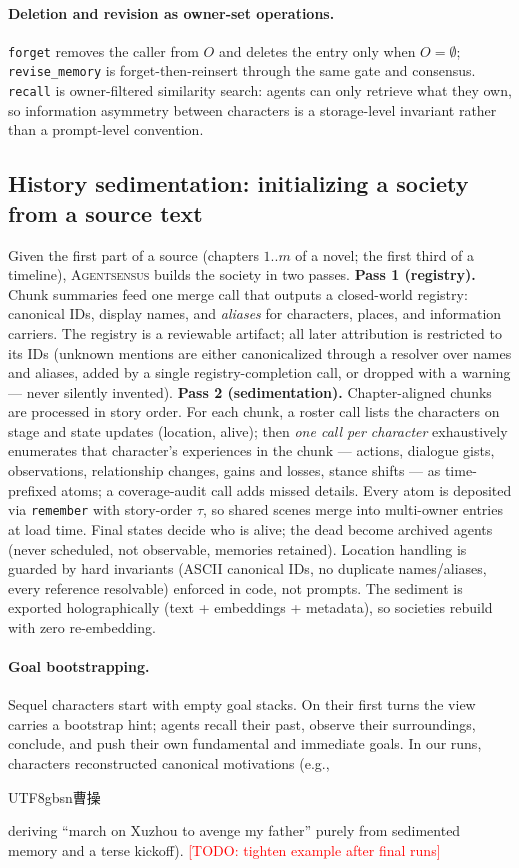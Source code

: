 \documentclass[11pt]{article}
\newcommand{\sysname}{\textsc{Agentsensus}}
\newcommand{\todo}[1]{\textcolor{red}{[TODO: #1]}}
\begin{document}
\paragraph{Deletion and revision as owner-set operations.}
\texttt{forget} removes the caller from $O$ and deletes the entry only when
$O=\emptyset$; \texttt{revise\_memory} is forget-then-reinsert through the same
gate and consensus. \texttt{recall} is owner-filtered similarity search: agents
can only retrieve what they own, so information asymmetry between characters is
a storage-level invariant rather than a prompt-level convention.

\subsection{History sedimentation: initializing a society from a source text}
\label{sec:sedimentation}
Given the first part of a source (chapters $1..m$ of a novel; the first third
of a timeline), \sysname{} builds the society in two passes.
\textbf{Pass 1 (registry).} Chunk summaries feed one merge call that outputs a
closed-world registry: canonical IDs, display names, and \emph{aliases} for
characters, places, and information carriers. The registry is a reviewable
artifact; all later attribution is restricted to its IDs (unknown mentions are
either canonicalized through a resolver over names and aliases, added by a
single registry-completion call, or dropped with a warning --- never silently
invented).
\textbf{Pass 2 (sedimentation).} Chapter-aligned chunks are processed in story
order. For each chunk, a roster call lists the characters on stage and state
updates (location, alive); then \emph{one call per character} exhaustively
enumerates that character's experiences in the chunk --- actions, dialogue
gists, observations, relationship changes, gains and losses, stance shifts ---
as time-prefixed atoms; a coverage-audit call adds missed details. Every atom
is deposited via \texttt{remember} with story-order $\tau$, so shared scenes
merge into multi-owner entries at load time. Final states decide who is alive;
the dead become archived agents (never scheduled, not observable, memories
retained). Location handling is guarded by hard invariants (ASCII canonical
IDs, no duplicate names/aliases, every reference resolvable) enforced in code,
not prompts. The sediment is exported holographically (text + embeddings +
metadata), so societies rebuild with zero re-embedding.

\paragraph{Goal bootstrapping.} Sequel characters start with empty goal
stacks. On their first turns the view carries a bootstrap hint; agents recall
their past, observe their surroundings, conclude, and push their own
fundamental and immediate goals. In our runs, characters reconstructed
canonical motivations (e.g., \begin{CJK}{UTF8}{gbsn}曹操\end{CJK} deriving
``march on Xuzhou to avenge my father'' purely from sedimented memory and a
terse kickoff). \todo{tighten example after final runs}
\end{document}
